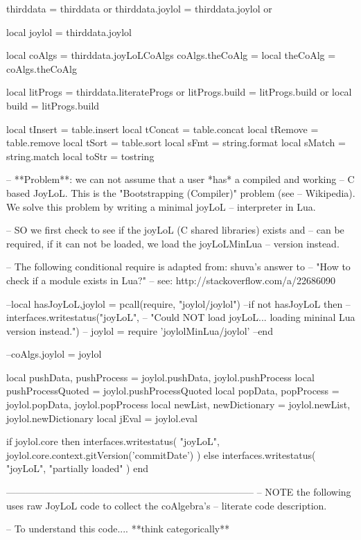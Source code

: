 thirddata        = thirddata        or {}
thirddata.joylol = thirddata.joylol or {}

local joylol     = thirddata.joylol

local coAlgs     = thirddata.joyLoLCoAlgs
coAlgs.theCoAlg  = {}
local theCoAlg   = coAlgs.theCoAlg

local litProgs   = thirddata.literateProgs or {}
litProgs.build   = litProgs.build or {}
local build      = litProgs.build

local tInsert = table.insert
local tConcat = table.concat
local tRemove = table.remove
local tSort   = table.sort
local sFmt    = string.format
local sMatch  = string.match
local toStr   = tostring

-- **Problem**: we can not assume that a user *has* a compiled and working 
-- C based JoyLoL. This is the "Bootstrapping (Compiler)" problem (see 
-- Wikipedia). We solve this problem by writing a minimal joyLoL 
-- interpreter in Lua. 

-- SO we first check to see if the joyLoL (C shared libraries) exists and 
-- can be required, if it can not be loaded, we load the joyLoLMinLua 
-- version instead. 

-- The following conditional require is adapted from: shuva's answer to 
--  "How to check if a module exists in Lua?"
-- see: http://stackoverflow.com/a/22686090

--local hasJoyLoL,joylol = pcall(require, "joylol/joylol")
--if not hasJoyLoL then
--  interfaces.writestatus("joyLoL",
--    "Could NOT load joyLoL... loading mininal Lua version instead.")
--  joylol = require 'joylolMinLua/joylol'
--end

--coAlgs.joylol = joylol

local pushData, pushProcess = joylol.pushData, joylol.pushProcess
local pushProcessQuoted = joylol.pushProcessQuoted
local popData, popProcess   = joylol.popData, joylol.popProcess
local newList, newDictionary = joylol.newList, joylol.newDictionary
local jEval = joylol.eval

if joylol.core then
  interfaces.writestatus(
    "joyLoL",
    joylol.core.context.gitVersion('commitDate')
  )
else
  interfaces.writestatus(
    "joyLoL",
    "partially loaded"
  )
end

-----------------------------------------------------------------------------
-- NOTE the following uses raw JoyLoL code to collect the coAlgebra's 
-- literate code description.

-- To understand this code.... **think categorically**

